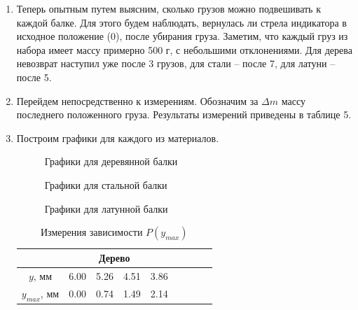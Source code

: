\documentclass[12pt]{article}
\begin{document}
\begin{enumerate}
        \item Теперь опытным путем выясним, сколько грузов можно подвешивать
        к каждой балке. Для этого будем наблюдать, вернулась ли стрела индикатора
        в исходное положение (0), после убирания груза. Заметим, что каждый груз
        из набора имеет массу примерно 500 г, с небольшими отклонениями.
        Для дерева невозврат наступил уже после 3 грузов, для стали -- после 7,
        для латуни -- после 5.
        \item Перейдем непосредственно к измерениям. Обозначим за $\Delta m$ массу
        последнего положенного груза. Результаты измерений приведены
        в таблице 5.
        \item Построим графики для каждого из материалов.
        \begin{figure}[H]
            \centering
            \caption{Графики для деревянной балки}
            
        \end{figure}
        \begin{figure}[H]
            \centering
            \caption{Графики для стальной балки}
            
        \end{figure}
        \begin{figure}[H]
            \centering
            \caption{Графики для латунной балки}
            
        \end{figure}
        \begin{table}[H]
            \centering
            \caption{Измерения зависимости $P(y_{max})$}
            \begin{tabular}{|ccccccccc|}
            \hline
            \multicolumn{9}{|c|}{Дерево}                                                                                                                                                                                                                          \\ \hline
            \multicolumn{1}{|c|}{$y$, мм}       & \multicolumn{1}{c|}{6.00} & \multicolumn{1}{c|}{5.26}  & \multicolumn{1}{c|}{4.51}  & \multicolumn{1}{c|}{3.86}  & \multicolumn{1}{c|}{}      & \multicolumn{1}{c|}{}      & \multicolumn{1}{c|}{}      &       \\ \hline
            \multicolumn{1}{|c|}{$y_{max}$, мм} & \multicolumn{1}{c|}{0.00} & \multicolumn{1}{c|}{0.74}  & \multicolumn{1}{c|}{1.49}  & \multicolumn{1}{c|}{2.14}  & \multicolumn{1}{c|}{}      & \multicolumn{1}{c|}{}      & \multicolumn{1}{c|}{}      &       \\ \hline

\end{tabular}
\end{table}
\end{enumerate}
\end{document}
